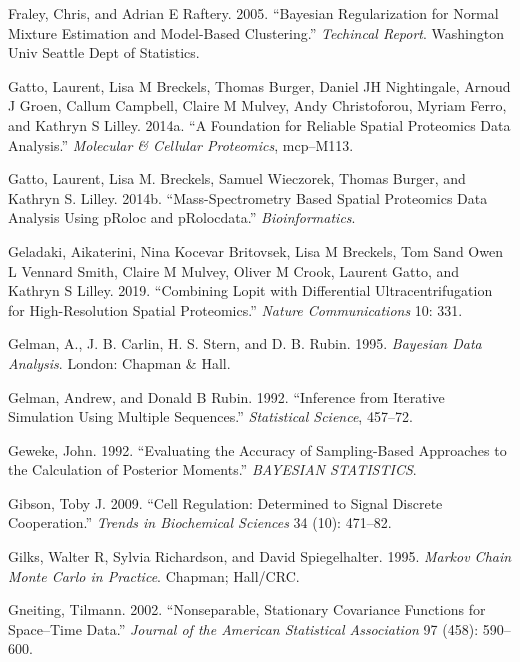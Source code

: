 \documentclass[
]{article}
\begin{document}
\leavevmode\hypertarget{ref-Fraley:2005}{}%
Fraley, Chris, and Adrian E Raftery. 2005. ``Bayesian Regularization for
Normal Mixture Estimation and Model-Based Clustering.'' \emph{Techincal
Report}. Washington Univ Seattle Dept of Statistics.

\leavevmode\hypertarget{ref-Gatto:2014b}{}%
Gatto, Laurent, Lisa M Breckels, Thomas Burger, Daniel JH Nightingale,
Arnoud J Groen, Callum Campbell, Claire M Mulvey, Andy Christoforou,
Myriam Ferro, and Kathryn S Lilley. 2014a. ``A Foundation for Reliable
Spatial Proteomics Data Analysis.'' \emph{Molecular \& Cellular
Proteomics}, mcp--M113.

\leavevmode\hypertarget{ref-pRoloc:2014}{}%
Gatto, Laurent, Lisa M. Breckels, Samuel Wieczorek, Thomas Burger, and
Kathryn S. Lilley. 2014b. ``Mass-Spectrometry Based Spatial Proteomics
Data Analysis Using pRoloc and pRolocdata.'' \emph{Bioinformatics}.

\leavevmode\hypertarget{ref-DC:2018}{}%
Geladaki, Aikaterini, Nina Kocevar Britovsek, Lisa M Breckels, Tom Sand
Owen L Vennard Smith, Claire M Mulvey, Oliver M Crook, Laurent Gatto,
and Kathryn S Lilley. 2019. ``Combining Lopit with Differential
Ultracentrifugation for High-Resolution Spatial Proteomics.''
\emph{Nature Communications} 10: 331.

\leavevmode\hypertarget{ref-Gelman:1995}{}%
Gelman, A., J. B. Carlin, H. S. Stern, and D. B. Rubin. 1995.
\emph{Bayesian Data Analysis}. London: Chapman \& Hall.

\leavevmode\hypertarget{ref-Gelman:1992}{}%
Gelman, Andrew, and Donald B Rubin. 1992. ``Inference from Iterative
Simulation Using Multiple Sequences.'' \emph{Statistical Science},
457--72.

\leavevmode\hypertarget{ref-Geweke:1992}{}%
Geweke, John. 1992. ``Evaluating the Accuracy of Sampling-Based
Approaches to the Calculation of Posterior Moments.'' \emph{BAYESIAN
STATISTICS}.

\leavevmode\hypertarget{ref-Gibson:2009}{}%
Gibson, Toby J. 2009. ``Cell Regulation: Determined to Signal Discrete
Cooperation.'' \emph{Trends in Biochemical Sciences} 34 (10): 471--82.

\leavevmode\hypertarget{ref-Gilks:1995}{}%
Gilks, Walter R, Sylvia Richardson, and David Spiegelhalter. 1995.
\emph{Markov Chain Monte Carlo in Practice}. Chapman; Hall/CRC.

\leavevmode\hypertarget{ref-Gneiting:2002}{}%
Gneiting, Tilmann. 2002. ``Nonseparable, Stationary Covariance Functions
for Space--Time Data.'' \emph{Journal of the American Statistical
Association} 97 (458): 590--600.
\end{document}
